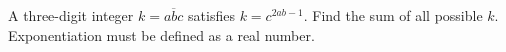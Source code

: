 A three-digit integer $k=\overline{abc}$ satisfies $k=c^{2ab-1}$. Find the sum of all possible $k$. Exponentiation must be defined as a real number.
